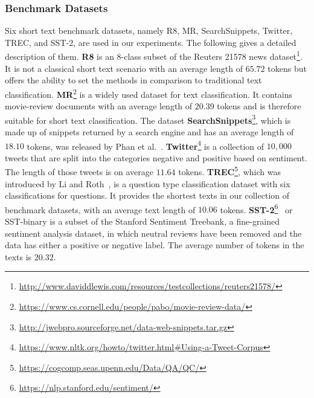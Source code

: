 \documentclass[runningheads]{llncs}
\begin{document}
\subsubsection{Benchmark Datasets}
Six short text benchmark datasets, namely R8, MR, SearchSnippets, Twitter, TREC, and SST-2, are used in our experiments. The following gives a detailed description of them.
\textbf{R8} is an 8-class subset of the Reuters 21578 news dataset\footnote{\url{http://www.daviddlewis.com/resources/testcollections/reuters21578/}}. It is not a classical short text scenario with an average length of $65.72$ tokens but offers the ability to set the methods in comparison to traditional text classification.
\textbf{MR}\footnote{\url{https://www.cs.cornell.edu/people/pabo/movie-review-data/}} is a widely used dataset for text classification. It contains movie-review documents with an average length of $20.39$ tokens and is therefore suitable for short text classification.
The dataset \textbf{SearchSnippets}\footnote{\url{http://jwebpro.sourceforge.net/data-web-snippets.tar.gz}}, which is made up of snippets returned by a search engine and has an average length of $18.10$ tokens, was released by Phan et al.~\cite{phan2008learning}.
\textbf{Twitter}\footnote{\url{https://www.nltk.org/howto/twitter.html\#Using-a-Tweet-Corpus}} is a collection of $10,000$ tweets that are split into the categories negative and positive based on sentiment. The length of those tweets is on average $11.64$ tokens.
\textbf{TREC}\footnote{\url{https://cogcomp.seas.upenn.edu/Data/QA/QC/}}, which was introduced by Li and Roth~\cite{li-roth-2002-learning}, is a question type classification dataset with six classifications for questions. It provides the shortest texts in our collection of benchmark datasets, with an average text length of $10.06$ tokens.
\textbf{SST-2}\footnote{\url{https://nlp.stanford.edu/sentiment/}}~\cite{SocherEtAl2013:RNTN} or SST-binary is a subset of the Stanford Sentiment Treebank, a fine-grained sentiment analysis dataset, in which neutral reviews have been removed and the data has either a positive or negative label. 
    The average number of tokens in the texts is $20.32$.
\end{document}
